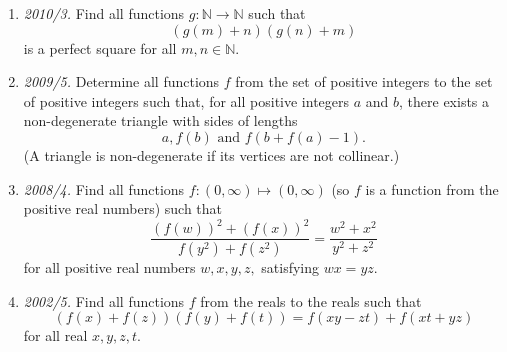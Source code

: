 \documentclass[11pt,a4paper]{article}
\begin{document}
\begin{enumerate}
\item\emph{2010/3.} Find all functions $g:\mathbb{N}\rightarrow\mathbb{N}$ such that \[\left(g(m)+n\right)\left(g(n)+m\right)\] is a perfect square for all $m,n\in\mathbb{N}.$

\item\emph{2009/5.} Determine all functions $ f$ from the set of positive integers to the set of positive integers such that, for all positive integers $ a$ and $ b$, there exists a non-degenerate triangle with sides of lengths
\[ a, f(b) \text{ and } f(b + f(a) - 1).\]
(A triangle is non-degenerate if its vertices are not collinear.)

\item\emph{2008/4.} Find all functions $ f: (0, \infty) \mapsto (0, \infty)$ (so $ f$ is a function from the positive real numbers) such that
\[ \frac {\left( f(w) \right)^2 + \left( f(x) \right)^2}{f(y^2) + f(z^2) } = \frac {w^2 + x^2}{y^2 + z^2} \]
for all positive real numbers $ w,x,y,z,$ satisfying $ wx = yz.$

\item\emph{2002/5.} Find all functions $f$ from the reals to the reals such that \[ \left(f(x)+f(z)\right)\left(f(y)+f(t)\right)=f(xy-zt)+f(xt+yz) \] for all real $x,y,z,t$.

\end{enumerate}
\end{document}
